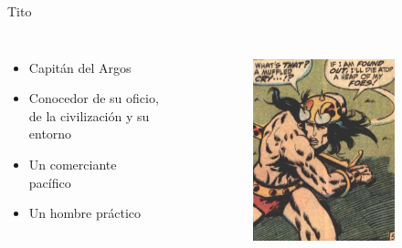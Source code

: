 \begin{frame}{Tito}
	\begin{columns}
		\begin{itemize}
			\item Capitán del Argos
			\item Conocedor de su oficio, de la civilización y su entorno
			\item Un comerciante pacífico
			\item Un hombre práctico
		\end{itemize}
		\begin{figure}[htp]
			\centering
			\begin{subfigure}[b]{0.3\textwidth}
				\includegraphics[width=\textwidth]{img/conan/CTB}
			\end{subfigure}
			~
			\begin{subfigure}[b]{0.27\textwidth}

\end{subfigure}
\end{figure}
\end{columns}
\end{frame}
